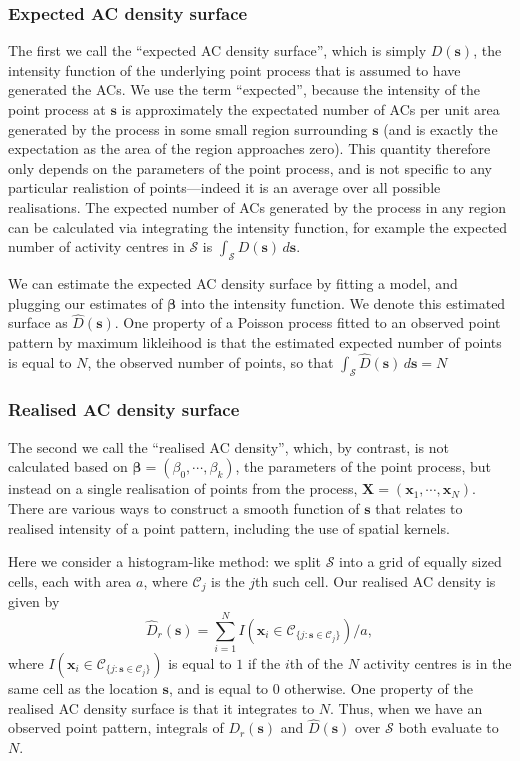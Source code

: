 \documentclass[useAMS,usenatbib,referee]{biom}
\begin{document}
\subsubsection{Expected AC density surface}

The first we call the ``expected AC density surface'', which is simply $D(\bm{s})$, the intensity function of the underlying point process that is assumed to have generated the ACs. We use the term ``expected'', because the intensity of the point process at $\bm{s}$ is approximately the expectated number of ACs per unit area generated by the process in some small region surrounding $\bm{s}$ (and is exactly the expectation as the area of the region approaches zero). This quantity therefore only depends on the parameters of the point process, and is not specific to any particular realistion of points---indeed it is an average over all possible realisations. The expected number of ACs generated by the process in any region can be calculated via integrating the intensity function, for example the expected number of activity centres in $\mathcal{S}$ is $\int_{\mathcal{S}} D(\bm{s}) \, d\bm{s}$.

We can estimate the expected AC density surface by fitting a model,
and plugging our estimates of $\bm{\beta}$ into the intensity
function. We denote this estimated surface as
$\widehat{D}(\bm{s})$. One property of a Poisson process fitted to
an observed point pattern by maximum likleihood is that the estimated expected number of
points is equal to $N$, the observed number of points, so that
$\int_{\mathcal{S}} \widehat{D}(\bm{s}) \, d\bm{s} = N$

\subsubsection{Realised AC density surface}

The second we call the ``realised AC density'', which, by contrast, is not calculated based on $\bm{\beta} = (\beta_0, \cdots, \beta_k)$, the parameters of the point process, but instead on a single realisation of points from the process, $\bm{X} = (\bm{x}_1, \cdots, \bm{x}_N)$. There are various ways to construct a smooth function of $\bm{s}$ that relates to realised intensity  of a point pattern, including the use of spatial kernels.

Here we consider a histogram-like method: we split $\mathcal{S}$ into a grid of equally sized cells, each with area $a$, where $\mathcal{C}_j$ is the $j$th such cell. Our realised AC density is given by
\begin{equation}
\widehat{D}_r(\bm{s}) = \sum_{i = 1}^N I(\bm{x}_i \in \mathcal{C}_{\{j: \bm{s} \in \mathcal{C}_j\}})/a,
\end{equation}
where $I(\bm{x}_i \in \mathcal{C}_{\{j: \bm{s} \in \mathcal{C}_j\}})$ is equal to $1$ if the $i$th of the $N$ activity centres is in the same cell as the location $\bm{s}$, and is equal to $0$ otherwise. One property of the realised AC density surface is that it integrates to $N$. Thus, when we have an observed point pattern, integrals of $D_r(\bm{s})$ and $\widehat{D}(\bm{s})$ over $\mathcal{S}$ both evaluate to $N$.
\end{document}

